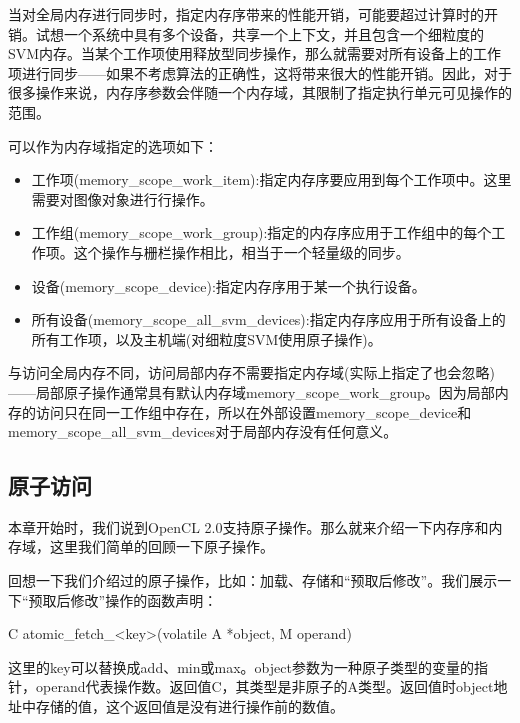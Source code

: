 当对全局内存进行同步时，指定内存序带来的性能开销，可能要超过计算时的开销。试想一个系统中具有多个设备，共享一个上下文，并且包含一个细粒度的SVM内存。当某个工作项使用释放型同步操作，那么就需要对所有设备上的工作项进行同步——如果不考虑算法的正确性，这将带来很大的性能开销。因此，对于很多操作来说，内存序参数会伴随一个内存域，其限制了指定执行单元可见操作的范围。

可以作为内存域指定的选项如下：

\begin{itemize}
\item 工作项(memory\_\allowbreak{}scope\_\allowbreak{}work\_\allowbreak{}item):指定内存序要应用到每个工作项中。这里需要对图像对象进行行操作。
\item 工作组(memory\_\allowbreak{}scope\_\allowbreak{}work\_\allowbreak{}group):指定的内存序应用于工作组中的每个工作项。这个操作与栅栏操作相比，相当于一个轻量级的同步。
\item 设备(memory\_\allowbreak{}scope\_\allowbreak{}device):指定内存序用于某一个执行设备。
\item 所有设备(memory\_\allowbreak{}scope\_\allowbreak{}all\_\allowbreak{}svm\_\allowbreak{}devices):指定内存序应用于所有设备上的所有工作项，以及主机端(对细粒度SVM使用原子操作)。
\end{itemize}

与访问全局内存不同，访问局部内存不需要指定内存域(实际上指定了也会忽略)——局部原子操作通常具有默认内存域memory\_\allowbreak{}scope\_\allowbreak{}work\_\allowbreak{}group。因为局部内存的访问只在同一工作组中存在，所以在外部设置memory\_\allowbreak{}scope\_\allowbreak{}device和memory\_\allowbreak{}scope\_\allowbreak{}all\_\allowbreak{}svm\_\allowbreak{}devices对于局部内存没有任何意义。

\subsection{原子访问}

本章开始时，我们说到OpenCL 2.0支持原子操作。那么就来介绍一下内存序和内存域，这里我们简单的回顾一下原子操作。

回想一下我们介绍过的原子操作，比如：加载、存储和“预取后修改”。我们展示一下“预取后修改”操作的函数声明：

\begin{codebox}[cpp]
C atomic_fetch_<key>(volatile A *object, M operand)
\end{codebox}

这里的key可以替换成add、min或max。object参数为一种原子类型的变量的指针，operand代表操作数。返回值C，其类型是非原子的A类型。返回值时object地址中存储的值，这个返回值是没有进行操作前的数值。

